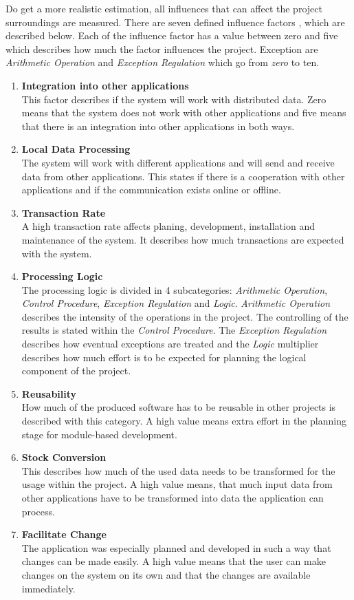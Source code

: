 Do get a more realistic estimation, all influences that can affect the project surroundings are measured. There are seven defined influence factors \cite{Softwaremanagement}, which are described below. Each of the influence factor has a value between zero and five which describes how much the factor influences the project. Exception are \textit{Arithmetic Operation} and \textit{Exception Regulation} which go from \textit{zero} to {ten}.\\

\begin{enumerate}
	\item \textbf{Integration into other applications}\\This factor describes if the system will work with distributed data. Zero means that the system does not work with other applications and five means that there is an integration into other applications in both ways.
	\item \textbf{Local Data Processing}\\The system will work with different applications and will send and receive data from other applications. This states if there is a cooperation with other applications and if the communication exists online or offline.
	\item \textbf{Transaction Rate}\\A high transaction rate affects planing, development, installation and maintenance of the system. It describes how much transactions are expected with the system.
	\item \textbf{Processing Logic}\\The processing logic is divided in 4 subcategories: \textit{Arithmetic Operation}, \textit{Control Procedure}, \textit{Exception Regulation} and \textit{Logic}. \textit{Arithmetic Operation} describes the intensity of the operations in the project. The controlling of the results is stated within the \textit{Control Procedure}. The \textit{Exception Regulation} describes how eventual exceptions are treated and the \textit{Logic} multiplier describes how much effort is to be expected for planning the logical component of the project.
	\item \textbf{Reusability}\\ How much of the produced software has to be reusable in other projects is described with this category. A high value means extra effort in the planning stage for module-based development.
	\item \textbf{Stock Conversion}\\ This describes how much of the used data needs to be transformed for the usage within the project. A high value means, that much input data from other applications have to be transformed into data the application can process.
	\item \textbf{Facilitate Change}\\ The application was especially planned and developed in such a way that changes can be made easily. A high value means that the user can make changes on the system on its own and that the changes are available immediately.
\end{enumerate}
